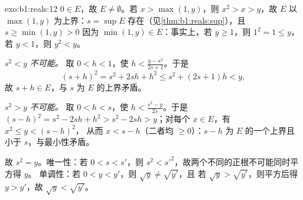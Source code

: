 \begin{solution}{exo:b1:reals:12}
$0 \in E$，故 $E \neq \emptyset$。若 $x > \max(1, y)$，则 $x^2 >
x > y$，故 $E$ 以 $\max(1, y)$ 为上界：$s = \sup E$
存在（见\cref{thm:b1:reals:sup}），且 $s \geq \min(1, y) > 0$
因为 $\min(1, y) \in E$：事实上，若 $y \geq 1$，则 $1^2 = 1
\leq y$，若 $y < 1$，则 $y^2 < y$。

\emph{$s^2 < y$ 不可能。} 取 $0 < h < 1$，使 $h <
\frac{y - s^2}{2s + 1}$。于是
\[
(s + h)^2 = s^2 + 2sh + h^2 \leq s^2 + (2s + 1)h < y ,
\]
故 $s + h \in E$，与 $s$ 为 $E$ 的上界矛盾。

\emph{$s^2 > y$ 不可能。} 取 $0 < h < s$，使 $h <
\frac{s^2 - y}{2s}$。于是 $(s - h)^2 = s^2 - 2sh + h^2 > s^2 -
2sh > y$；对每个 $x \in E$，有 $x^2 \leq y < (s - h)^2$，
从而 $x < s - h$（二者均 $\geq 0$）：$s - h$ 为
$E$ 的一个上界且小于 $s$，与最小性矛盾。

故 $s^2 = y$。唯一性：若 $0 < s < s'$，则 $s^2 <
s'^2$，故两个不同的正根不可能同时平方得 $y$。
单调性：若 $0 < y < y'$，则 $\sqrt y \neq \sqrt{y'}$，且
若 $\sqrt y > \sqrt{y'}$，则平方后得 $y > y'$，故 $\sqrt
y < \sqrt{y'}$。
\end{solution}

